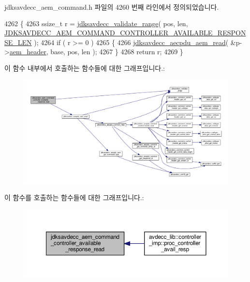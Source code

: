 jdksavdecc\+\_\+aem\+\_\+command.\+h 파일의 4260 번째 라인에서 정의되었습니다.


\begin{DoxyCode}
4262 \{
4263     ssize\_t r = \hyperlink{group__util_ga9c02bdfe76c69163647c3196db7a73a1}{jdksavdecc\_validate\_range}( pos, len, 
      \hyperlink{group__command__controller__available__response_ga98b123879ee62947fd3e0daf599268fb}{JDKSAVDECC\_AEM\_COMMAND\_CONTROLLER\_AVAILABLE\_RESPONSE\_LEN}
       );
4264     \textcolor{keywordflow}{if} ( r >= 0 )
4265     \{
4266         \hyperlink{group__aecpdu__aem_gae2421015dcdce745b4f03832e12b4fb6}{jdksavdecc\_aecpdu\_aem\_read}( &p->\hyperlink{structjdksavdecc__aem__command__controller__available__response_ae1e77ccb75ff5021ad923221eab38294}{aem\_header}, base, pos, len );
4267     \}
4268     \textcolor{keywordflow}{return} r;
4269 \}
\end{DoxyCode}


이 함수 내부에서 호출하는 함수들에 대한 그래프입니다.\+:
\nopagebreak
\begin{figure}[H]
\begin{center}
\leavevmode
\includegraphics[width=350pt]{group__command__controller__available__response_gafb1b0dede49f19f13ef16c8308cfc5f6_cgraph}
\end{center}
\end{figure}




이 함수를 호출하는 함수들에 대한 그래프입니다.\+:
\nopagebreak
\begin{figure}[H]
\begin{center}
\leavevmode
\includegraphics[width=350pt]{group__command__controller__available__response_gafb1b0dede49f19f13ef16c8308cfc5f6_icgraph}
\end{center}
\end{figure}


